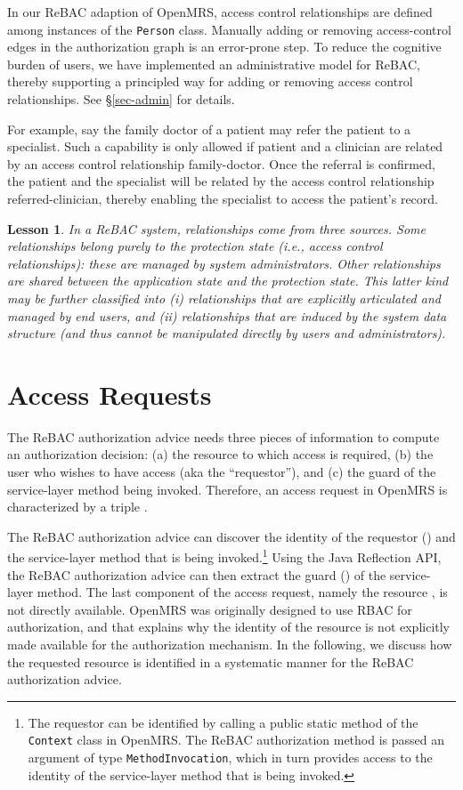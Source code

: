 \documentclass{acm_proc_article-sp}
\newcommand{\textcode}[1]{\texttt{#1}}
\newtheorem{lesson}{Lesson}
\begin{document}
\begin{compactenum}
  In our ReBAC adaption of OpenMRS, access control relationships are
  defined among instances of the \textcode{Person} class.  Manually
  adding or removing access-control edges in the authorization graph
  is an error-prone step.  To reduce the cognitive burden of users, we
  have implemented an administrative model for ReBAC, thereby
  supporting a principled way for adding or removing access control
  relationships.  See \S \ref{sec-admin} for details.

  For example, say the family doctor of a patient may refer the
  patient to a specialist.  Such a capability is only allowed if
  patient and a clinician are related by an access control relationship
  \textsf{family-doctor}.  Once the referral is confirmed, the patient
  and the specialist will be related by the access control
  relationship \textsf{referred-clinician}, thereby enabling the
  specialist to access the patient's record.
\end{compactenum}
\begin{lesson}
  In a ReBAC system, relationships come from three sources.  Some
  relationships belong purely to the protection state (i.e., access
  control relationships): these are managed by system administrators.
  Other relationships are shared between the application state and the
  protection state.  This latter kind may be further classified into
  (i) relationships that are explicitly articulated and managed by end
  users, and (ii) relationships that are induced by the system data
  structure (and thus cannot be manipulated directly by users and
  administrators).
\end{lesson}

\section{Access Requests}
\label{sec-request}


The ReBAC authorization advice needs three pieces of information to
compute an authorization decision: (a) the resource  to which
access is required, (b) the user  who wishes to have access (aka
the ``requestor''), and (c) the guard  of the service-layer method
being invoked.  Therefore, an access request in OpenMRS is
characterized by a triple .

The ReBAC authorization advice can discover the identity of the
requestor () and the service-layer method that is being
invoked.\footnote{The requestor can be identified by calling a public
  static method of the \textcode{Context} class in OpenMRS.  The ReBAC
  authorization method is passed an argument of type
  \textcode{MethodInvocation}, which in turn provides access to the
  identity of the service-layer method that is being invoked.}  Using
the Java Reflection API, the ReBAC authorization advice can then
extract the guard () of the service-layer method. The last
component of the access request, namely the resource , is not
directly available. OpenMRS was originally designed to use RBAC for
authorization, and that explains why the identity of the resource is
not explicitly made available for the authorization mechanism.  In the
following, we discuss how the requested resource  is identified in
a systematic manner for the ReBAC authorization advice.
\end{document}
